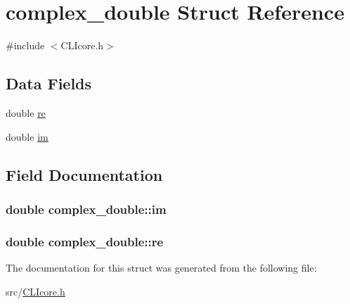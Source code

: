 \hypertarget{structcomplex__double}{\section{complex\+\_\+double Struct Reference}
\label{structcomplex__double}
}


{\ttfamily \#include $<$C\+L\+Icore.\+h$>$}

\subsection*{Data Fields}
\begin{DoxyCompactItemize}
\item 
double \hyperlink{structcomplex__double_af3466e0949b17c561569ba827aa878f4}{re}
\item 
double \hyperlink{structcomplex__double_a24c8308c824e9b7256bd1beccb571520}{im}
\end{DoxyCompactItemize}


\subsection{Field Documentation}
\hypertarget{structcomplex__double_a24c8308c824e9b7256bd1beccb571520}{
\subsubsection[{im}]{\setlength{\rightskip}{0pt plus 5cm}double complex\+\_\+double\+::im}}\label{structcomplex__double_a24c8308c824e9b7256bd1beccb571520}
\hypertarget{structcomplex__double_af3466e0949b17c561569ba827aa878f4}{
\subsubsection[{re}]{\setlength{\rightskip}{0pt plus 5cm}double complex\+\_\+double\+::re}}\label{structcomplex__double_af3466e0949b17c561569ba827aa878f4}


The documentation for this struct was generated from the following file\+:\begin{DoxyCompactItemize}
\item 
src/\hyperlink{CLIcore_8h}{C\+L\+Icore.\+h}\end{DoxyCompactItemize}
